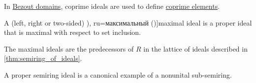 \begin{definition}
\begin{thmenum}[resume=def:semiring_ideal]
    In \hyperref[def:bezout_domain]{Bezout domains}, coprime ideals are used to define \hyperref[def:coprime_elements]{coprime elements}.

     A (left, right or two-sided) \term[bg=максимален (\cite[7]{КоцевСидеров2016КомутативнаАлгебра}), ru=максимальный (\cite[406]{Винберг2014КурсАлгебры})]{maximal ideal} is a proper ideal that is maximal with respect to set inclusion.

    The maximal ideals are the predecessors of \( R \) in the lattice of ideals described in \cref{thm:semiring_of_ideals}.
  \end{thmenum}
\end{definition}
\begin{comments}
  \item A proper semiring ideal is a canonical example of a nonunital sub-semiring.
\end{comments}

